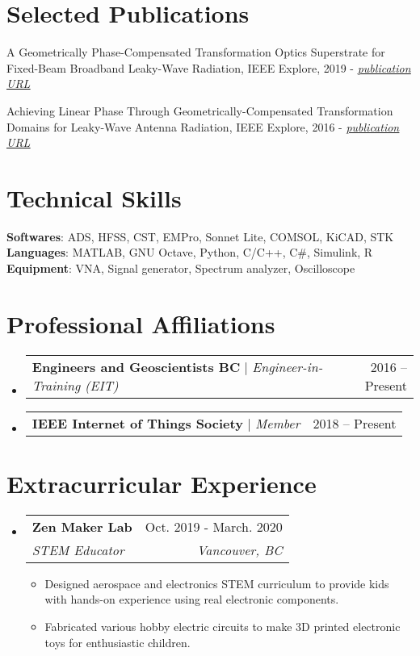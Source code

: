 \documentclass[letterpaper,11pt]{article}
\makeatletter
\newcommand{\resumeItem}[1]{
  \item\small{
    {#1 \vspace{-2pt}}
  }
}
\newcommand{\resumeSubheading}[4]{
  \vspace{-2pt}\item
    \begin{tabular*}{0.97\textwidth}[t]{l@{\extracolsep{\fill}}r}
      \textbf{#1} & #2 \\
      \textit{\small#3} & \textit{\small #4} \\
    \end{tabular*}\vspace{-7pt}
}
\newcommand{\resumeProjectHeading}[2]{
    \item
    \begin{tabular*}{0.97\textwidth}{l@{\extracolsep{\fill}}r}
      \small#1 & #2 \\
    \end{tabular*}\vspace{-7pt}
}
\newcommand{\resumeSubHeadingListStart}{\begin{itemize}[leftmargin=0.15in, label={}]}
\newcommand{\resumeSubHeadingListEnd}{\end{itemize}}
\newcommand{\resumeItemListStart}{\begin{itemize}}
\newcommand{\resumeItemListEnd}{\end{itemize}\vspace{-5pt}}
\makeatother
\begin{document}
%
\section{Selected Publications}
 \begin{itemize}[leftmargin=0.15in, label={\tiny$\bullet$}]
    \small{
    \item{A Geometrically Phase-Compensated Transformation Optics Superstrate for Fixed-Beam Broadband Leaky-Wave Radiation, IEEE Explore, 2019 - \href{https://ieeexplore.ieee.org/document/8739640}{\textit{\underline{publication URL}}}}
    \item{ Achieving Linear Phase Through Geometrically-Compensated Transformation Domains for Leaky-Wave Antenna Radiation, IEEE Explore, 2016 - \href{https://ieeexplore.ieee.org/document/7695749}{\textit{\underline{publication URL}}}}
    }
 \end{itemize}


\section{Technical Skills}
 \begin{itemize}[leftmargin=0.15in, label={}]
    \small{\item{
     \textbf{Softwares}{: ADS, HFSS, CST, EMPro, Sonnet Lite, COMSOL, KiCAD, STK} \\
     \textbf{Languages}{: MATLAB, GNU Octave, Python, C/C++, C\#, Simulink, R} \\
     \textbf{Equipment}{: VNA, Signal generator, Spectrum analyzer, Oscilloscope}
    }}
 \end{itemize}

%
\section{Professional Affiliations}
    \resumeSubHeadingListStart
      \resumeProjectHeading
          {\textbf{Engineers and Geoscientists BC} $|$ \emph{Engineer-in-Training (EIT) }}{2016 -- Present}

      \resumeProjectHeading
          {\textbf{IEEE Internet of Things Society} $|$ \emph{Member}}{2018 -- Present}

    \resumeSubHeadingListEnd
    
\section{Extracurricular Experience}
  \resumeSubHeadingListStart

    \resumeSubheading
      {Zen Maker Lab}{Oct. 2019 - March. 2020}
      {STEM Educator}{Vancouver, BC}
      \resumeItemListStart
        \resumeItem{Designed aerospace and electronics STEM curriculum to provide kids with hands-on experience using real electronic components.}
        \resumeItem{Fabricated various hobby electric circuits to make 3D printed electronic toys for enthusiastic children.}
      \resumeItemListEnd

    \resumeSubHeadingListEnd
    
\end{document}
